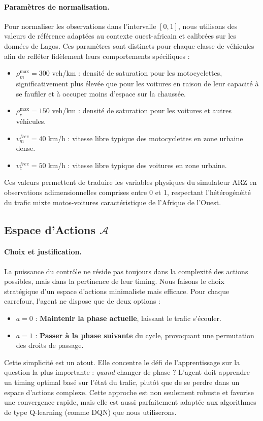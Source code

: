 \paragraph{Paramètres de normalisation.}
Pour normaliser les observations dans l'intervalle $[0, 1]$, nous utilisons des valeurs de référence adaptées au contexte ouest-africain et calibrées sur les données de Lagos. Ces paramètres sont distincts pour chaque classe de véhicules afin de refléter fidèlement leurs comportements spécifiques :

\begin{itemize}
    \item $\rho^{\max}_m = 300$ veh/km : densité de saturation pour les motocyclettes, significativement plus élevée que pour les voitures en raison de leur capacité à se faufiler et à occuper moins d'espace sur la chaussée.
    \item $\rho^{\max}_c = 150$ veh/km : densité de saturation pour les voitures et autres véhicules.
    \item $v^{free}_m = 40$ km/h : vitesse libre typique des motocyclettes en zone urbaine dense.
    \item $v^{free}_c = 50$ km/h : vitesse libre typique des voitures en zone urbaine.
\end{itemize}

Ces valeurs permettent de traduire les variables physiques du simulateur ARZ en observations adimensionnelles comprises entre 0 et 1, respectant l'hétérogénéité du trafic mixte motos-voitures caractéristique de l'Afrique de l'Ouest.

\subsection{Espace d'Actions $\mathcal{A}$}
\label{subsec:espace_actions}

\paragraph{Choix et justification.} La puissance du contrôle ne réside pas toujours dans la complexité des actions possibles, mais dans la pertinence de leur timing. Nous faisons le choix stratégique d'un espace d'actions minimaliste mais efficace. Pour chaque carrefour, l'agent ne dispose que de deux options :
\begin{itemize}
    \item $a=0$ : \textbf{Maintenir la phase actuelle}, laissant le trafic s'écouler.
    \item $a=1$ : \textbf{Passer à la phase suivante} du cycle, provoquant une permutation des droits de passage.
\end{itemize}
Cette simplicité est un atout. Elle concentre le défi de l'apprentissage sur la question la plus importante : \textit{quand} changer de phase ? L'agent doit apprendre un timing optimal basé sur l'état du trafic, plutôt que de se perdre dans un espace d'actions complexe. Cette approche est non seulement robuste et favorise une convergence rapide, mais elle est aussi parfaitement adaptée aux algorithmes de type Q-learning (comme DQN) que nous utiliserons.

